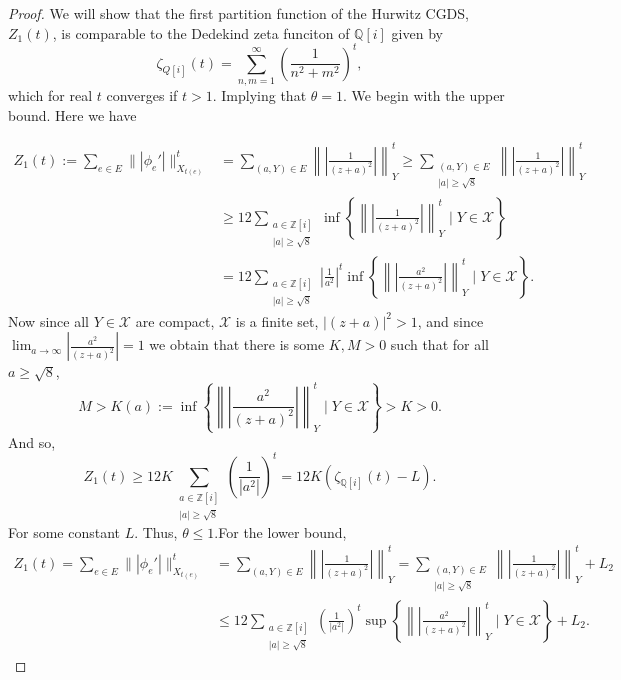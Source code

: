 \documentclass[10pt,a4paper]{amsart}
\newcommand{\QQ}{\ensuremath{\mathbb Q}}%
\newcommand{\ZZ}{\ensuremath{\mathbb Z}} %
\newcommand{\cX}{\ensuremath{\mathcal{X}}}
\begin{document}
\begin{proof}
    We will show that the first partition function of the Hurwitz CGDS, $Z_1(t)$, is comparable to the Dedekind zeta funciton of $\mathbb{Q}[i]$ given by $$\zeta_{Q[i]}(t)=\sum_{n,m=1}^{\infty}\left(\frac{1}{n^2+m^2}\right)^t,$$
    which for real $t$ converges if $t>1$. Implying that $\theta =1$. We begin with the upper bound. Here we have 

    \begin{align*}
        Z_1(t) := \sum_{e\in E}\||\phi_e'|\|^t_{X_{t(e)}} 
        &= \sum_{(a,Y)\in E}\left\|\left\vert\frac{1}{(z+a)^2}\right\vert\right\|_Y^t \geq \sum_{\substack{(a,Y)\in E\\ |a|\geq \sqrt{8}}} \left\|\left\vert\frac{1}{(z+a)^2}\right\vert\right\|_Y^t\\
        &\geq 12 \sum_{\substack{a\in \ZZ[i]\\ |a|\geq \sqrt{8}}}\inf\left\{\left\|\left\vert\frac{1}{(z+a)^2}\right\vert\right\|_Y^t\;\Bigg|\; Y\in \cX \right\}\\
        &= 12 \sum_{\substack{a\in \ZZ[i]\\ |a|\geq \sqrt{8}}} \left\vert\frac{1}{a^2}\right\vert^t\inf\left\{\left\|\left\vert\frac{a^2}{(z+a)^2}\right\vert\right\|_Y^t\;\Bigg|\; Y\in \cX \right\}.
    \end{align*}
    Now since all $Y \in \cX$ are compact, $\cX$ is a finite set, $|(z+a)|^2>1$, and since $\lim_{a\to\infty}\left\vert\frac{a^2}{(z+a)^2}\right\vert = 1$ we obtain that there is some $K,M>0$ such that for all $a\geq \sqrt 8$,
    $$
        M> K(a) := \inf\left\{\left\|\left\vert\frac{a^2}{(z+a)^2}\right\vert\right\|_Y^t\;\Bigg|\; Y\in \cX \right\} > K >0.
    $$
    And so,
    $$
        Z_1(t) \geq 12K\sum_{\substack{a\in \ZZ[i]\\ |a|\geq \sqrt{8}}}\left(\frac{1}{|a^2|}\right)^t = 12K(\zeta_{\QQ[i]}(t)-L).
    $$
    For some constant $L$. Thus, $\theta\leq 1$.\newline For the lower bound, 
    \begin{align*}
        Z_1(t) = \sum_{e\in E}\||\phi_e'|\|^t_{X_{t(e)}} 
        &= \sum_{(a,Y)\in E}\left\|\left\vert\frac{1}{(z+a)^2}\right\vert\right\|_Y^t = \sum_{\substack{(a,Y)\in E\\ |a|\geq \sqrt{8}}} \left\|\left\vert\frac{1}{(z+a)^2}\right\vert\right\|_Y^t+L_2 \\
        &\leq 12\sum_{\substack{a\in \ZZ[i]\\ |a|\geq \sqrt{8}}}\left(\frac{1}{|a^2|}\right)^t \sup\left\{\left\|\left\vert\frac{a^2}{(z+a)^2}\right\vert\right\|_Y^t\;\Bigg|\; Y\in \cX \right\}+L_2.

\end{align*}
\end{proof}
\end{document}
